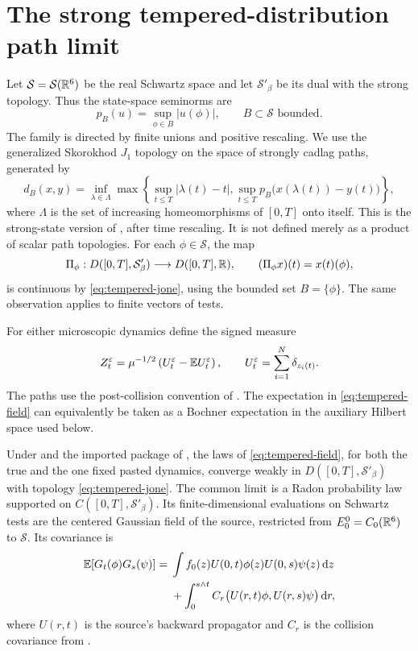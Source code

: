 \section{The strong tempered-distribution path limit}\label{sec:tempered}

Let $\mathcal S=\mathcal S(\mathbb R^6)$ be the real Schwartz space and let
$\mathcal S'_\beta$ be its dual with the strong topology. Thus the
state-space seminorms are
\[
 p_B(u)=\sup_{\phi\in B}|u(\phi)|,
 \qquad B\subset\mathcal S\text{ bounded}.
\]
The family is directed by finite unions and positive rescaling.
We use the generalized Skorokhod $J_1$ topology on the space of
strongly cadlag paths, generated by
\begin{equation}\label{eq:tempered-jone}
 d_B(x,y)=\inf_{\lambda\in\Lambda}
 \max\left\{\sup_{t\leq T}|\lambda(t)-t|,
       \sup_{t\leq T}p_B\bigl(x(\lambda(t))-y(t)\bigr)\right\},
\end{equation}
where $\Lambda$ is the set of increasing homeomorphisms of $[0,T]$
onto itself. This is the strong-state version of
\cite[\S1, equation (1.3)]{Jakubowski}, after time rescaling.
It is not defined merely as a product of scalar path topologies.
For each $\phi\in\mathcal S$, the map
\[
 \Pi_\phi:D([0,T],\mathcal S'_\beta)\longrightarrow D([0,T],\mathbb R),
 \qquad (\Pi_\phi x)(t)=x(t)(\phi),
\]
is continuous by \eqref{eq:tempered-jone}, using the bounded set
$B=\{\phi\}$. The same observation applies to finite vectors of tests.

For either microscopic dynamics define the signed measure
\begin{equation}\label{eq:tempered-field}
 Z_t^\varepsilon=\mu^{-1/2}\left(U_t^\varepsilon-\mathbb E U_t^\varepsilon\right),
 \qquad U_t^\varepsilon=\sum_{i=1}^N\delta_{z_i(t)}.
\end{equation}
The paths use the post-collision convention of .
The expectation in \eqref{eq:tempered-field} can equivalently be taken
as a Bochner expectation in the auxiliary Hilbert space used below.

\begin{theorem}
\label{thm:tempered}
Under  and the imported package of
, the laws of \eqref{eq:tempered-field}, for both
the true and the one fixed pasted dynamics, converge weakly in
$D([0,T],\mathcal S'_\beta)$ with topology
\eqref{eq:tempered-jone}. The common limit is a Radon probability law
supported on $C([0,T],\mathcal S'_\beta)$.
Its finite-dimensional evaluations on Schwartz tests are the centered
Gaussian field of the source, restricted from $E_0^0=C_0(\mathbb R^6)$ to
$\mathcal S$. Its covariance is
\begin{align}\label{eq:tempered-covariance}
 \mathbb E[G_t(\phi)G_s(\psi)]
 ={}&\int f_0(z)U(0,t)\phi(z)U(0,s)\psi(z)\,\mathrm d z\notag\\
 &+\int_0^{s\wedge t}
 C_r\bigl(U(r,t)\phi,U(r,s)\psi\bigr)\,\mathrm d r,
\end{align}
where $U(r,t)$ is the source's backward propagator and $C_r$ is the
collision covariance from .
\end{theorem}

